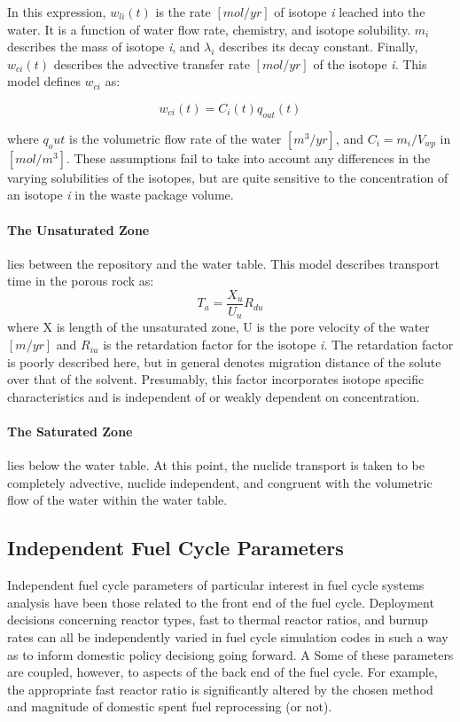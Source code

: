 In this expression, $w_{li}(t)$ is the rate $[mol/yr]$ of isotope 
\emph{i} leached into the water.  It is a function of water flow rate, 
chemistry, and isotope solubility. $m_i$ describes the mass of isotope 
\emph{i}, and $\lambda_i$ describes its decay constant. Finally, 
$w_{ci}(t)$ describes the advective transfer rate $[mol/yr]$ of the 
isotope \emph{i}. This model defines $w_{ci}$ as:

\begin{equation}
w_{ci}(t)=C_i(t)q_{out}(t)
\end{equation}

where $q_out$ is the volumetric flow rate of the water $[m^3/yr]$, and 
$C_i = m_i/V_{wp}$ in $[mol/m^3]$. These assumptions fail to take into 
account any differences in the varying solubilities of the isotopes, 
but are quite sensitive to the concentration of an isotope \emph{i} in 
the waste package volume.  

\paragraph{The Unsaturated Zone} lies between the repository and the 
water table. This model describes transport time in the porous rock 
as:
\begin{equation}
T_a= \frac{X_u}{U_u}R_{du}
\end{equation}
where X is length of the unsaturated zone, U is the pore velocity of 
the water $[m/yr]$ and $R_{iu}$ is the retardation factor for the 
isotope \emph{i}. The retardation factor is poorly described here, but 
in general denotes migration distance of the solute over that of the 
solvent. Presumably, this factor incorporates isotope specific 
characteristics and is independent of or weakly dependent on 
concentration.  

\paragraph{The Saturated Zone} lies below the water table. At this 
point, the nuclide transport is taken to be completely advective, 
nuclide independent, and congruent with the volumetric flow of the 
water within the water table. 



\subsection{Independent Fuel Cycle Parameters}
Independent fuel cycle parameters of particular interest in fuel cycle 
systems analysis have been those related to the front end of the fuel 
cycle. Deployment decisions concerning reactor types, fast to thermal 
reactor ratios, and burnup rates can all be independently varied in 
fuel cycle simulation codes in such a way as to inform domestic policy 
decisiong going forward. A Some of these parameters are coupled, 
however, to aspects of the back end of the fuel cycle. For example, 
the appropriate fast reactor ratio is significantly altered by the 
chosen method and magnitude of domestic spent fuel reprocessing (or 
not).

